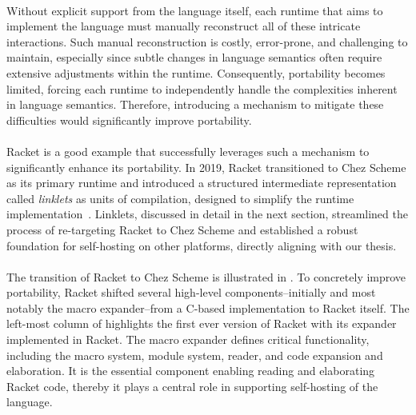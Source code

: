		\paragraph{}%
			Without explicit support from the language itself, each runtime that aims to implement the language must manually reconstruct all of these intricate interactions. Such manual reconstruction is costly, error-prone, and challenging to maintain, especially since subtle changes in language semantics often require extensive adjustments within the runtime. Consequently, portability becomes limited, forcing each runtime to independently handle the complexities inherent in language semantics. Therefore, introducing a mechanism to mitigate these difficulties would significantly improve portability.

		\paragraph{}%
			Racket is a good example that successfully leverages such a mechanism to significantly enhance its portability. In 2019, Racket transitioned to Chez Scheme as its primary runtime and introduced a structured intermediate representation called \emph{linklets} as units of compilation, designed to simplify the runtime implementation~\cite{icfp2019}. Linklets, discussed in detail in the next section, streamlined the process of re-targeting Racket to Chez Scheme and established a robust foundation for self-hosting on other platforms, directly aligning with our thesis.


		\paragraph{}%
			The transition of Racket to Chez Scheme is illustrated in . To concretely improve portability, Racket shifted several high-level components--initially and most notably the macro expander--from a C-based implementation to Racket itself. The left-most column of  highlights the first ever version of Racket with its expander implemented in Racket. The macro expander defines critical functionality, including the macro system, module system, reader, and code expansion and elaboration. It is the essential component enabling reading and elaborating Racket code, thereby it plays a central role in supporting self-hosting of the language.

